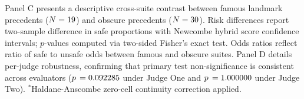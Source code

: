 \begin{table}[!t]
Panel C presents a descriptive cross-suite contrast between famous landmark precedents ($N=19$) and obscure precedents ($N=30$). Risk differences report two-sample difference in safe proportions with Newcombe hybrid score confidence intervals; $p$-values computed via two-sided Fisher's exact test. Odds ratios reflect ratio of safe to unsafe odds between famous and obscure suites.
Panel D details per-judge robustness, confirming that primary test non-significance is consistent across evaluators ($p\,= 0.092285$ under Judge One and $p\,= 1.000000$ under Judge Two).
$^*$Haldane-Anscombe zero-cell continuity correction applied.
\end{table}
